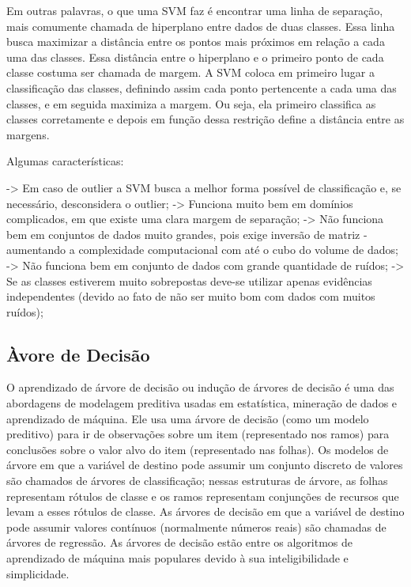 \documentclass{article}
\begin{document}
Em outras palavras, o que uma SVM faz é encontrar uma linha de separação, mais comumente chamada de hiperplano entre dados de duas classes. Essa linha busca maximizar a distância entre os pontos mais próximos em relação a cada uma das classes. Essa distância entre o hiperplano e o primeiro ponto de cada classe costuma ser chamada de margem. A SVM coloca em primeiro lugar a classificação das classes, definindo assim cada ponto pertencente a cada uma das classes, e em seguida maximiza a margem. Ou seja, ela primeiro classifica as classes corretamente e depois em função dessa restrição define a distância entre as margens.

Algumas características:

-> Em caso de outlier a SVM busca a melhor forma possível de classificação e, se necessário, desconsidera o outlier;
-> Funciona muito bem em domínios complicados, em que existe uma clara margem de separação;
-> Não funciona bem em conjuntos de dados muito grandes, pois exige inversão de matriz - aumentando a complexidade computacional com até o cubo do volume de dados;
-> Não funciona bem em conjunto de dados com grande quantidade de ruídos;
-> Se as classes estiverem muito sobrepostas deve-se utilizar apenas evidências independentes (devido ao fato de não ser muito bom com dados com muitos ruídos);

\subsection{Àvore de Decisão}
O aprendizado de árvore de decisão ou indução de árvores de decisão é uma das abordagens de modelagem preditiva usadas em estatística, mineração de dados e aprendizado de máquina. Ele usa uma árvore de decisão (como um modelo preditivo) para ir de observações sobre um item (representado nos ramos) para conclusões sobre o valor alvo do item (representado nas folhas). Os modelos de árvore em que a variável de destino pode assumir um conjunto discreto de valores são chamados de árvores de classificação; nessas estruturas de árvore, as folhas representam rótulos de classe e os ramos representam conjunções de recursos que levam a esses rótulos de classe. As árvores de decisão em que a variável de destino pode assumir valores contínuos (normalmente números reais) são chamadas de árvores de regressão. As árvores de decisão estão entre os algoritmos de aprendizado de máquina mais populares devido à sua inteligibilidade e simplicidade. 
\end{document}

